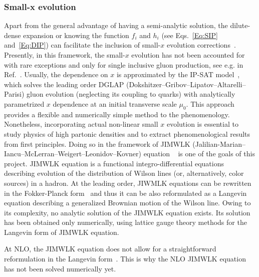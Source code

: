 \subsubsection*{Small-x evolution}
Apart from the general advantage of having a semi-analytic solution, 
the dilute-dense expansion or knowing the function $f_i$ and $h_i$ (see Eqs.~\eqref{Eq:SIP} and~\eqref{Eq:DIP}) 
can facilitate the inclusion of small-$x$ evolution corrections~\cite{Kuraev:1977fs,
Balitsky:1978ic, 
Balitsky:1997mk, 
Balitsky:1998ya, 
Kovchegov:1999yj,
Kovchegov:1999ua, 
JalilianMarian:1997dw, 
JalilianMarian:1997gr,
Iancu:2001ad, 
Iancu:2000hn}.
Presently, in this framework,  the small-$x$ evolution has not been accounted for 
with rare exceptions and only
for single inclusive gluon production, see e.g. in Ref.~\cite{Dumitru:2018iko}. 
Usually, the dependence on $x$ is approximated by the IP-SAT model~\cite{Kowalski:2003hm,Rezaeian:2012ji},
which solves the leading order  DGLAP (Dokshitzer--Gribov--Lipatov--Altarelli--Parisi)  gluon evolution (neglecting its coupling to quarks) 
with analytically parametrized $x$ dependence at an initial 
transverse scale $\mu_0$. 
This approach provides a flexible and numerically simple method 
to the phenomenology. Nonetheless, incorporating actual non-linear 
small $x$ evolution is essential to study physics 
of high partonic densities and to extract phenomenological results from first principles.  
Doing so in the framework of JIMWLK (Jalilian-Marian--Iancu--McLerran--Weigert--Leonidov--Kovner) equation 
~\cite{JalilianMarian:1997dw, 
JalilianMarian:1997gr,
Iancu:2001ad, 
Iancu:2000hn} 
is one of the goals of this project. 
JIMWLK equation is a functional integro-differential 
equations describing evolution of the distribution of Wilson lines (or, alternatively, color sources) in a 
hadron. At the leading order, JIWMLK equations can be rewritten in the Fokker-Planck form~\cite{Weigert:2000gi}
and thus it can be also reformulated as  a Langevin equation describing a generalized Brownian motion of 
the Wilson line. Owing to its complexity, no analytic solution of the JIMWLK equation exists. 
Its solution has been obtained only numerically, using lattice gauge theory methods for the
 Langevin form of JIMWLK equation.

 At NLO, the JIMWLK equation does not allow for a straightforward reformulation in the Langevin form~\cite{Kovner:2014lca,Balitsky:2013fea}. 
 This is why the NLO JIMWLK equation has not been solved numerically yet. 	




